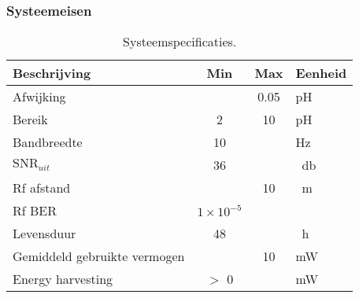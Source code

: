 \begin{frame}
    \frametitle{Systeemeisen}

    \begin{table}[ht]
        \centering
        \begin{tabular}{|l|c c|l|}
            \hline
            Beschrijving                 & Min               & Max   & Eenheid           \\
            \hline 
            Afwijking                    &                   & 0.05  & pH                \\ 
            Bereik                       & 2                 & 10    & pH                \\
            Bandbreedte                  & 10                &       & Hz                \\
            $\mathrm{SNR}_{uit}$         & 36                &       & \qty{}{\decibel}  \\
            Rf afstand                   &                   & 10    & \qty{}{\meter}    \\
            Rf BER                       & $1\times10^{-5}$  &       &                   \\
            Levensduur                   & 48                &       & \qty{}{\hour}     \\
            Gemiddeld gebruikte vermogen &                   & 10    & mW                \\
            Energy harvesting            & $>$ 0             &       & mW                \\
            \hline
        \end{tabular}
        \caption{Systeemspecificaties.}
        \label{tab:systemSpecs}
    \end{table}

\end{frame}

